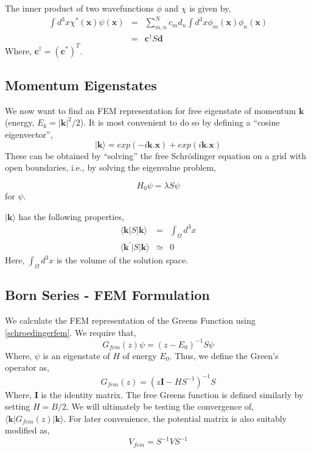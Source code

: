 \documentclass[a4paper,10pt]{report}
\begin{document}
The inner product of two wavefunctions $\phi$ and $\chi$ is given by,
\begin{align}\label{innerproduct}
 \int d^3x \chi^*(\mathbf{x})\psi(\mathbf{x}) &=& \displaystyle\sum_{m,n}^{N}c_md_n\int d^3x \phi_m(\mathbf{x})\phi_n(\mathbf{x})\\
 &=& \mathbf{c}^{\dagger}S\mathbf{d}
\end{align}
 Where, $\mathbf{c}^{\dagger}=(\mathbf{c}^*)^T$.

\subsection{Momentum Eigenstates}
We now want to find an FEM representation for free eigenstate of momentum $\mathbf{k}$ (energy,
$E_k=|\mathbf{k}|^2/2$). 
It is most convenient to do so by defining a ``cosine eigenvector'',
\begin{equation}\label{cosevec}
 |\mathbf{k}\rangle = exp(-i\mathbf{k}.\mathbf{x}) + exp(i\mathbf{k}.\mathbf{x})
\end{equation}
These can be obtained by ``solving'' the free Schrödinger equation on a grid with open
boundaries, i.e., by solving the eigenvalue problem,

\begin{equation}\label{freeschroedinger}
 H_0\psi=\lambda S\psi
\end{equation}
for $\psi$.

$|\mathbf{k}\rangle$ has the following properties,
\begin{align}
 \langle\mathbf{k}|S|\mathbf{k}\rangle &=&\int_{\Omega} d^3x\\
 \langle\mathbf{k}^{\prime}|S|\mathbf{k}\rangle &\simeq& 0
\end{align}
Here, $\int_{\Omega} d^3x$ is the volume of the solution space.

\subsection{Born Series - FEM Formulation}
We calculate the FEM representation of the Greens Function using \eqref{schroedingerfem}. We require that,
\begin{equation}\label{greenfemreq}
 G_{fem}(z)\psi=(z-E_0)^{-1}S\psi
\end{equation}
 Where, $\psi$ is an eigenstate of $H$ of energy $E_0$. Thus, we define the Green's operator as,
\begin{equation}\label{greenfemdef}
 G_{fem}(z)=\left(z\mathbf{I}-HS^{-1}\right)^{-1}S
\end{equation}
 Where, $\mathbf{I}$ is the identity matrix. The free Greens function is defined similarly by setting
$H=B/2$. We will ultimately be testing the convergence of, $\langle\mathbf{k}|G_{fem}(z)|\mathbf{k}\rangle$.
For later convenience, the potential matrix is also suitably modified as,
\begin{equation}\label{potmat}
 V_{fem}=S^{-1}VS^{-1}
\end{equation}
\end{document}
